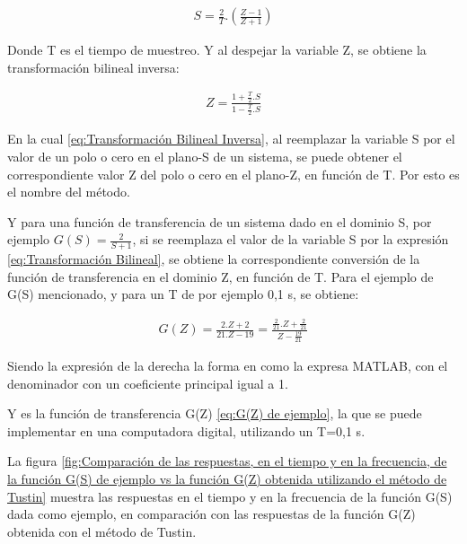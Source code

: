\documentclass{article}
\begin{document}
\begin{sloppypar}
\begin{align}   \label{eq:Transformación Bilineal}
    S=\frac{2}{T}.\left(\frac{Z-1}{Z+1}\right)
\end{align}

Donde T es el tiempo de muestreo. Y al despejar la variable Z, se obtiene la transformación bilineal inversa:

\begin{align}   \label{eq:Transformación Bilineal Inversa}
    Z=\frac{1+\frac{T}{2}.S}{1-\frac{T}{2}.S}
\end{align}

En la cual \ref{eq:Transformación Bilineal Inversa}, al reemplazar la variable S por el valor de un polo o cero en el plano-S de un sistema, se puede obtener el correspondiente valor Z del polo o cero en el plano-Z, en función de T. Por esto es el nombre del método.

Y para una función de transferencia de un sistema dado en el dominio S, por ejemplo $G(S)=\frac{2}{S+1}$, si se reemplaza el valor de la variable S por la expresión \ref{eq:Transformación Bilineal}, se obtiene la correspondiente conversión de la función de transferencia en el dominio Z, en función de T. Para el ejemplo de G(S) mencionado, y para un T de por ejemplo 0,1 s, se obtiene:

\begin{align}   \label{eq:G(Z) de ejemplo}
    G(Z)=\frac{2.Z+2}{21.Z-19}=\frac{\frac{2}{21}.Z+\frac{2}{21}}{Z-\frac{19}{21}}
\end{align}

Siendo la expresión de la derecha la forma en como la expresa MATLAB, con el denominador con un coeficiente principal igual a 1.

Y es la función de transferencia G(Z) \ref{eq:G(Z) de ejemplo}, la que se puede implementar en una computadora digital, utilizando un T=0,1 s.

La figura \ref{fig:Comparación de las respuestas, en el tiempo y en la frecuencia, de la función G(S) de ejemplo vs la función G(Z) obtenida utilizando el método de Tustin} muestra las respuestas en el tiempo y en la frecuencia de la función G(S) dada como ejemplo, en comparación con las respuestas de la función G(Z) obtenida con el método de Tustin.


\end{sloppypar}
\end{document}
